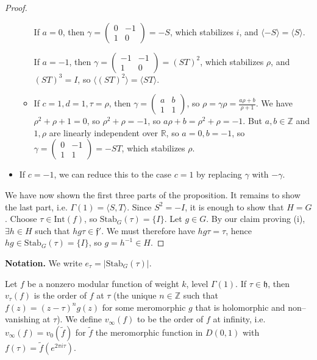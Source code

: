 \documentclass{article}
\theoremstyle{definition}
\begin{document}
\begin{proof}
\begin{itemize}
\begin{itemize}
            If $a=0$, then $\gamma = \begin{pmatrix} 0  & -1 \\ 1 & 0 \end{pmatrix} = -S$, which stabilizes $i$, and $\langle -S \rangle = \langle S \rangle$.
            \vspace{1mm}
             
            If $a=-1$, then $\gamma = \begin{pmatrix} -1 & -1 \\ 1 & 0 \end{pmatrix} = (ST)^2$, which stabilizes $\rho$, and $(ST)^3 = I$, so $\langle (ST)^2 \rangle = \langle ST \rangle$.
            \item If $c=1, d=1, \tau = \rho$, then $\gamma = \begin{pmatrix} a & b \\1 & 1 \end{pmatrix}$, so $\rho = \gamma \rho = \frac{a \rho + b}{\rho + 1}$. We have $\rho^2 + \rho + 1 = 0$, so $\rho^2 + \rho = -1$, so $a \rho + b = \rho^2 + \rho = -1$. But $a, b \in \mathbb{Z}$ and $1,\rho$ are linearly independent over $\mathbb{R}$, so $a = 0, b = -1$, so $\gamma = \begin{pmatrix} 0 & -1 \\ 1 & 1 \end{pmatrix} = -ST$, which stabilizes $\rho$.
        \end{itemize}
        \item If $c = -1$, we can reduce this to the case $c=1$ by replacing $\gamma$ with $-\gamma$.
    \end{itemize}
    We have now shown the first three parts of the proposition. It remains to show the last part, i.e. $\Gamma(1) = \langle S,T \rangle$. Since $S^2 = -I$, it is enough to show that $H = G$. Choose $\tau \in \text{Int}(f)$, so $\text{Stab}_G(\tau) = \{I\}$. Let $g \in G$. By our claim proving (i), $\exists h \in H$ such that $hg \tau  \in \mathfrak{f}'$. We must therefore have $hg \tau = \tau$, hence $h g  \in \text{Stab}_G(\tau) = \{I\}$, so $g = h^{-1} \in H$.
\end{proof}


\textbf{Notation.} We write $e_{\tau} = |\text{Stab}_G(\tau)|$.
\vspace{1mm}
 
Let $f$ be a nonzero modular function of weight $k$, level $\Gamma(1)$. If $\tau \in \mathfrak{h}$, then $v_{\tau}(f)$ is the order of $f$ at $\tau$ (the unique $n \in \mathbb{Z}$ such that $f(z) = (z-\tau)^n g(z)$ for some meromorphic $g$ that is holomorphic and non--vanishing at $\tau$). We define $v_{\infty}(f)$ to be the order of $f$ at infinity, i.e. $v_{\infty}(f)=v_0(\tilde{f})$ for $\tilde{f}$ the meromorphic function in $D(0,1)$ with $f(\tau) = \tilde{f}(e^{2\pi i \tau})$.
\end{document}
